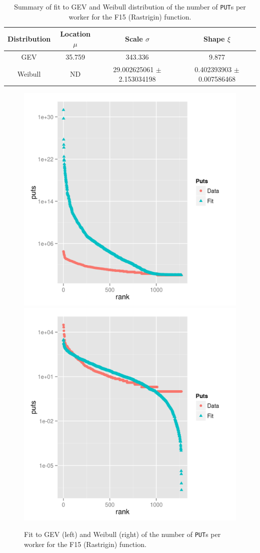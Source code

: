 \documentclass[journal,onecolumn]{IEEEtran}
\begin{document}
%
\begin{table}
\caption{Summary of fit to GEV and Weibull distribution of
  the number of {\tt PUT}s per worker for the F15 (Rastrigin) function. \label{tab:puts:ww:f15}}
\begin{center}
\begin{tabular}{cccc}
\hline
Distribution & Location $\mu$ & Scale $\sigma$ & Shape $\xi$ \\
\hline
GEV & 35.759  &  343.336   & 9.877 \\
Weibull & ND & 29.002625061 $\pm$ 2.153034198  & 0.402393903 $\pm$ 0.007586468 \\
\hline
\end{tabular}
\end{center}
\end{table}
%
\begin{figure}[!htb]
\centering
\includegraphics[width=0.49\linewidth]{gev-fit-ww-rastrigin-workers.png}
\includegraphics[width=0.49\linewidth]{weibull-fit-ww-rastrigin-workers.png}
\caption{Fit to GEV (left) and Weibull (right) of the number of {\tt PUT}s per worker for the F15 (Rastrigin) function.} 
\label{fig:fit:rastrigin}
\end{figure}
%
\end{document}
